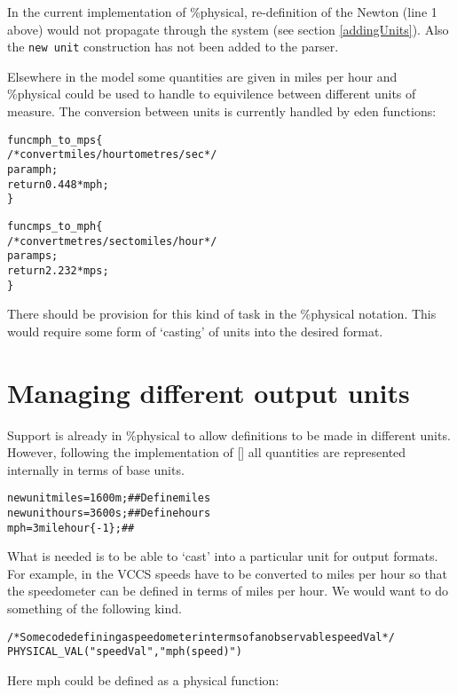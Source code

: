 \documentclass[a4paper]{article}
\begin{document}
In the current implementation of \%physical, re-definition of the Newton (line 
1 above) would not propagate through the system (see section 
\ref{addingUnits}). Also the \texttt{new unit} construction has not been added 
to the parser.

Elsewhere in the model some quantities are given in miles per hour and 
\%physical could be used to handle to equivilence
between different units of measure. The conversion between units is currently 
handled by eden functions:

\begin{alltt}
%eden
func mph_to_mps \{
  /* convert miles/hour to metres/sec */
  para mph;
  return 0.448 * mph;
\}

func mps_to_mph \{
  /* convert metres/sec to miles/hour */
  para mps;
  return 2.232 * mps;
\}
\end{alltt}

There should be provision for this kind of task in the 
\%physical notation. This would require some form of `casting' of units
into the desired format.

\section{Managing different output units \label{unitCasting}}

Support is already in \%physical to allow definitions to be made in different 
units. However,
following the implementation of [] all quantities are represented internally in 
terms of base units.


\begin{alltt}
%physical
new unit miles = 1600 m;   ## Define miles
new unit hours = 3600 s;   ## Define hours
mph = 3 milehour\{-1\};      ## %physical stores the value: mph = 16 ms{-1}
\end{alltt}

What is needed is to be able to `cast' into a particular unit for output formats. 
For example,
in the VCCS speeds have to be converted to miles per hour so that the 
speedometer can be defined in terms of miles per hour. We would want to do 
something of the following kind.

\begin{alltt}
%eden
/* Some code defining a speedometer in terms of an observable speedVal */
%eden
PHYSICAL_VAL("speedVal","mph(speed)")
\end{alltt}

Here mph could be defined as a physical function:
\end{document}
